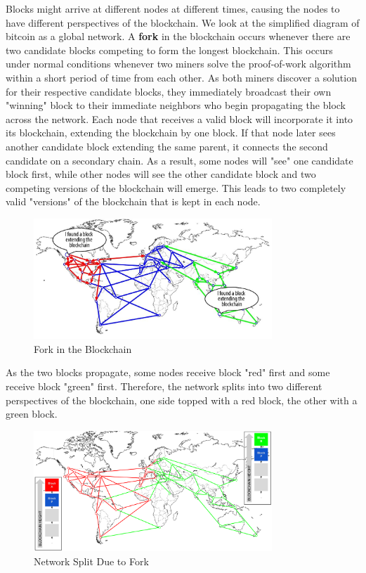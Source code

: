 \documentclass{article}
\begin{document}
    Blocks might arrive at different nodes at different times, causing the nodes to have different perspectives of the blockchain. We look at the simplified diagram of bitcoin as a global network. A \textbf{fork} in the blockchain occurs whenever there are two candidate blocks competing to form the longest blockchain. This occurs under normal conditions whenever two miners solve the proof-of-work algorithm within a short period of time from each other. As both miners discover a solution for their respective candidate blocks, they immediately broadcast their own "winning" block to their immediate neighbors who begin propagating the block across the network. Each node that receives a valid block will incorporate it into its blockchain, extending the blockchain by one block. If that node later sees another candidate block extending the same parent, it connects the second candidate on a secondary chain. As a result, some nodes will "see" one candidate block first, while other nodes will see the other candidate block and two competing versions of the blockchain will emerge. This leads to two completely valid "versions" of the blockchain that is kept in each node.

    \begin{figure}[H]
    \centering
    \includegraphics[width=0.8\textwidth]{img/msbt_0803.png.jpg}
    \caption{Fork in the Blockchain}
    \end{figure}

    As the two blocks propagate, some nodes receive block "red" first and some receive block "green" first. Therefore, the network splits into two different perspectives of the blockchain, one side topped with a red block, the other with a green block.

    \begin{figure}[H]
    \centering
    \includegraphics[width=0.8\textwidth]{img/msbt_0804.png}
    \caption{Network Split Due to Fork}
    \end{figure}
\end{document}
